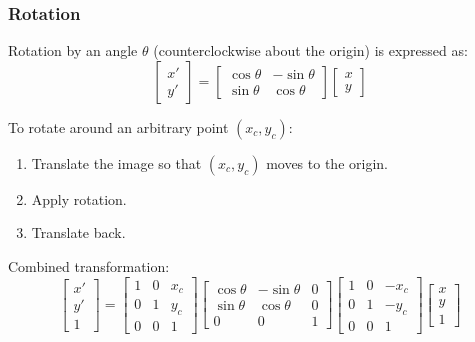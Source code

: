 \documentclass[12pt,a4paper]{AnantDocumentation}
\begin{document}
\subsubsection{Rotation}
Rotation by an angle $\theta$ (counterclockwise about the origin) is expressed as:
\begin{equation}
\begin{bmatrix} x' \\ y' \end{bmatrix} =
\begin{bmatrix}
\cos\theta & -\sin\theta \\
\sin\theta & \cos\theta
\end{bmatrix}
\begin{bmatrix} x \\ y \end{bmatrix}
\end{equation}

To rotate around an arbitrary point $(x_c, y_c)$:
\begin{enumerate}
\item Translate the image so that $(x_c, y_c)$ moves to the origin.
\item Apply rotation.
\item Translate back.
\end{enumerate}

Combined transformation:
\begin{equation}
\begin{bmatrix} x' \\ y' \\ 1 \end{bmatrix} =
\begin{bmatrix}
1 & 0 & x_c \\
0 & 1 & y_c \\
0 & 0 & 1
\end{bmatrix}
\begin{bmatrix}
\cos\theta & -\sin\theta & 0 \\
\sin\theta & \cos\theta & 0 \\
0 & 0 & 1
\end{bmatrix}
\begin{bmatrix}
1 & 0 & -x_c \\
0 & 1 & -y_c \\
0 & 0 & 1
\end{bmatrix}
\begin{bmatrix} x \\ y \\ 1 \end{bmatrix}
\end{equation}
\end{document}
